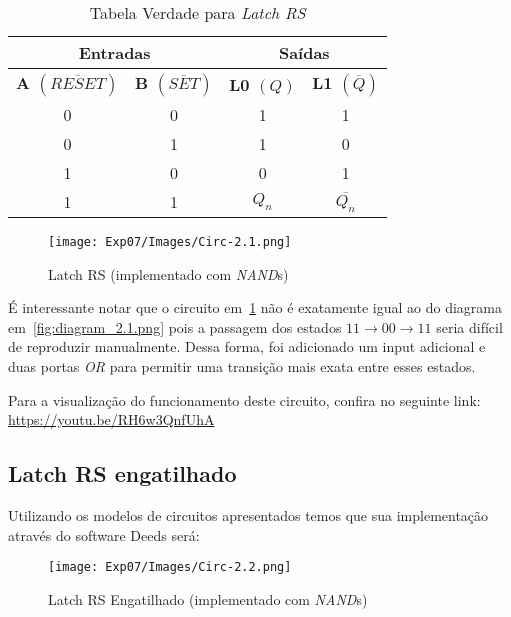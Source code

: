 \documentclass[12pt]{article}
\begin{document}
\begin{table}[H]
    \centering
    \caption{Tabela Verdade para \emph{Latch RS}}
    \begin{tabular}{|c|c||c|c|}\hline
      \multicolumn{2}{|c||}{Entradas} & \multicolumn{2}{|c|}{Saídas} \\\hline
      \textbf{A $(\overline{RESET})$} & \textbf{B $(\overline{SET})$} & \textbf{L0 $(Q)$} & \textbf{L1 $(\overline{Q})$} \\\hline
      0 & 0 & 1 & 1 \\\hline
      0 & 1 & 1 & 0 \\\hline
      1 & 0 & 0 & 1 \\\hline
      1 & 1 & $Q_{n}$ & $\overline{Q_{n}}$ \\\hline
    \end{tabular}\label{tab:truth_table_latch_rs}
\end{table}

\begin{figure}[H]
  \centering
  \texttt{[image: Exp07/Images/Circ-2.1.png]}
  \caption{Latch RS (implementado com \emph{NAND}s)}\label{fig:Circ-2.1.png}
\end{figure}

É interessante notar que o circuito em~\ref{fig:Circ-2.1.png} não é exatamente
igual ao do diagrama em~\ref{fig:diagram_2.1.png} pois a passagem dos estados
$11 \rightarrow 00 \rightarrow 11$ seria difícil de reproduzir manualmente.
Dessa forma, foi adicionado um input adicional e duas portas \emph{OR} para
permitir uma transição mais exata entre esses estados.

Para a visualização do funcionamento deste circuito, confira no seguinte link:
\href{https://youtu.be/RH6w3QnfUhA}{https://youtu.be/RH6w3QnfUhA}

\subsection{Latch RS engatilhado}\label{sec:2.2}

Utilizando os modelos de circuitos apresentados temos que sua implementação
através do software Deeds será:

\begin{figure}[H]
  \centering
  \texttt{[image: Exp07/Images/Circ-2.2.png]}
  \caption{Latch RS Engatilhado (implementado com \emph{NAND}s)}\label{fig:LatchRS-Engatilhado.png}
\end{figure}
\end{document}
